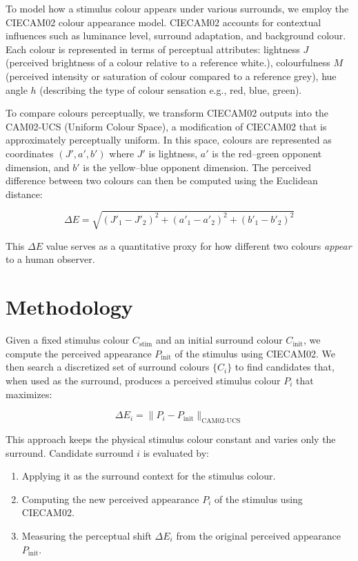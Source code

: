 \documentclass[11pt]{article}
\begin{document}
To model how a stimulus colour appears under various surrounds, we employ the CIECAM02 colour appearance model. CIECAM02 accounts for contextual influences such as luminance level, surround adaptation, and background colour. Each colour is represented in terms of perceptual attributes: lightness $J$ (perceived brightness of a colour relative to a reference white.), colourfulness $M$ (perceived intensity or saturation of colour compared to a reference grey), hue angle $h$ (describing the type of colour sensation e.g., red, blue, green).

To compare colours perceptually, we transform CIECAM02 outputs into the CAM02-UCS (Uniform Colour Space), a modification of CIECAM02 that is approximately perceptually uniform. In this space, colours are represented as coordinates $(J', a', b')$ where $J'$ is lightness, $a'$ is the red–green opponent dimension, and $b'$ is the yellow–blue opponent dimension. The perceived difference between two colours can then be computed using the Euclidean distance:

\begin{equation}
\Delta E = \sqrt{(J'_1 - J'_2)^2 + (a'_1 - a'_2)^2 + (b'_1 - b'_2)^2}
\end{equation}

This $\Delta E$ value serves as a quantitative proxy for how different two colours \emph{appear} to a human observer.

\section{Methodology}

Given a fixed stimulus colour $C_{\text{stim}}$ and an initial surround colour $C_{\text{init}}$, we compute the perceived appearance $P_{\text{init}}$ of the stimulus using CIECAM02. We then search a discretized set of surround colours $\{C_i\}$ to find candidates that, when used as the surround, produces a perceived stimulus colour $P_i$ that maximizes:

\begin{equation}
\Delta E_i = \|P_i - P_{\text{init}}\|_{\text{CAM02-UCS}}
\end{equation}

This approach keeps the physical stimulus colour constant and varies only the surround. Candidate surround $i$ is evaluated by:
\begin{enumerate}
    \item Applying it as the surround context for the stimulus colour.
    \item Computing the new perceived appearance $P_i$ of the stimulus using CIECAM02.
    \item Measuring the perceptual shift $\Delta E_i$ from the original perceived appearance $P_{\text{init}}$.
\end{enumerate}
\end{document}

